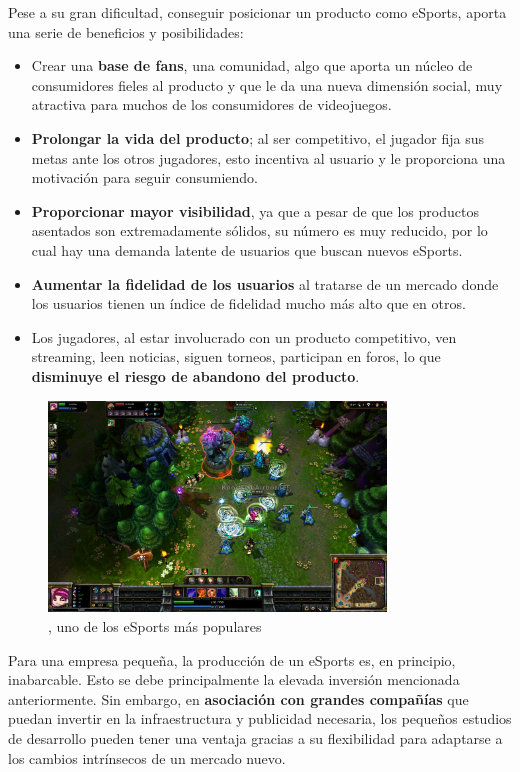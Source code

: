 Pese a su gran dificultad, conseguir posicionar un producto como eSports, aporta una serie de beneficios y posibilidades: 
\begin{itemize}
\item Crear una \textbf{base de fans}, una comunidad, algo que aporta un núcleo de consumidores fieles al producto y que le da una nueva dimensión social, muy atractiva para muchos de los consumidores de videojuegos.
\item \textbf{Prolongar la vida del producto}; al ser competitivo, el jugador fija sus metas ante los otros jugadores, esto incentiva al usuario y le proporciona una motivación para seguir consumiendo.
\item \textbf{Proporcionar mayor visibilidad}, ya que a pesar de que los productos asentados son extremadamente sólidos, su número es muy reducido, por lo cual hay una demanda latente de usuarios que buscan nuevos eSports.
\item \textbf{Aumentar la fidelidad de los usuarios} al tratarse de un mercado donde los usuarios tienen un índice de fidelidad mucho más alto que en otros.
\item Los jugadores, al estar involucrado con un producto competitivo, ven streaming, leen noticias, siguen torneos, participan en foros, lo que \textbf{disminuye el riesgo de abandono del producto}.
\end{itemize}

\begin{figure}[h]
    \centering
    \includegraphics[width=0.8\textwidth]{images/estadodelarte/mercado/foto-lol}
    \caption{, uno de los eSports más populares}
    \label{foto-lol}
\end{figure}

Para una empresa pequeña, la producción de un eSports es, en principio, inabarcable. Esto se debe principalmente la elevada inversión mencionada anteriormente. Sin embargo, en \textbf{asociación con grandes compañías} que puedan invertir en la infraestructura y publicidad necesaria, los pequeños estudios de desarrollo pueden tener una ventaja gracias a su flexibilidad para adaptarse a los cambios intrínsecos de un mercado nuevo. 


